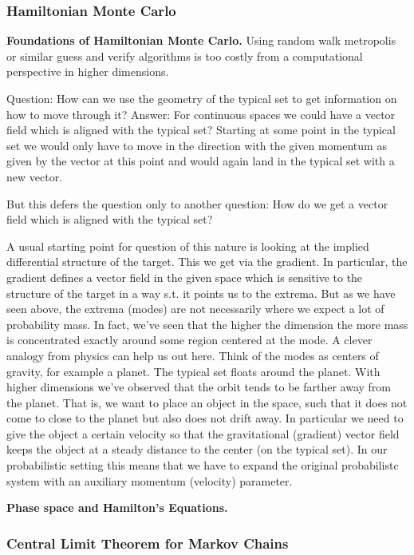 \subsubsection*{Hamiltonian Monte Carlo}

\textbf{Foundations of Hamiltonian Monte Carlo.}
Using random walk metropolis or similar guess and verify algorithms is too costly
from a computational perspective in higher dimensions.

Question: How can we use the geometry of the typical set to get information
on how to move through it?
Answer: For continuous spaces we could have a vector field which is aligned with the typical set?
Starting at some point in the typical set we would only have to move in the direction with
the given momentum as given by the vector at this point and would again land in the typical set with a new vector.

But this defers the question only to another question: How do we get a vector field
which is aligned with the typical set?

A usual starting point for question of this nature is looking at the implied differential structure of the target.
This we get via the gradient. In particular, the gradient defines a vector field in the given space which is
sensitive to the structure of the target in a way s.t. it points us to the extrema.
But as we have seen above, the extrema (modes) are not necessarily where we expect
a lot of probability mass. In fact, we've seen that the higher the dimension the more
mass is concentrated exactly around some region centered at the mode.
A clever analogy from physics can help us out here. Think of the modes as centers of gravity, for example a planet.
The typical set floats around the planet. With higher dimensions we've observed that
the orbit tends to be farther away from the planet. That is, we want to place an object
in the space, such that it does not come to close to the planet but also does not drift away.
In particular we need to give the object a certain velocity so that the gravitational (gradient)
vector field keeps the object at a steady distance to the center (on the typical set).
In our probabilistic setting this means that we have to expand the original probabilistc system with
an auxiliary momentum (velocity) parameter.

\textbf{Phase space and Hamilton's Equations.}

\subsubsection*{Central Limit Theorem for Markov Chains}

